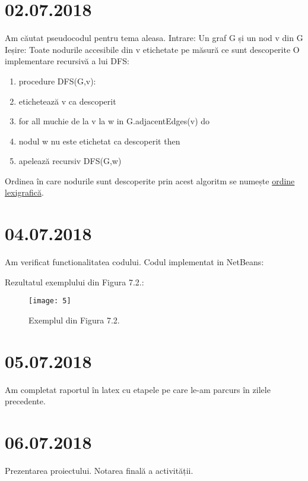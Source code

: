 \documentclass{report}
\begin{document}
\chapter{02.07.2018}
Am căutat pseudocodul pentru tema aleasa.\newline
\hspace*{0.5cm}Intrare: Un graf G și un nod v din G\newline
\hspace*{0.5cm}Ieșire: Toate nodurile accesibile din v etichetate pe măsură ce sunt descoperite\newline
\hspace*{0.5cm}O implementare recursivă a lui DFS:\newline
\begin{enumerate}
\item procedure DFS(G,v):
\item  etichetează v ca descoperit
\item  for all muchie de la v la w in G.adjacentEdges(v) do
\item    \hspace*{1cm} nodul w nu este etichetat ca descoperit then
\item     \hspace{1cm}apelează recursiv DFS(G,w)
\end{enumerate}
\hspace*{0.5cm}Ordinea în care nodurile sunt descoperite prin acest algoritm se numește \underline{ordine lexigrafică}.


\chapter{04.07.2018}
Am verificat functionalitatea codului. \newline
Codul implementat in NetBeans:
\begin{figure}[ht]
  \hspace*{1.5cm}\subfloat[1]{\texttt{[image: 1]}} 
  \hspace*{1.5cm}\subfloat[2]{\texttt{[image: 2]}}\newline
  \hspace*{1.5cm}\subfloat[3]{\texttt{[image: 3]}}
  \hspace*{1.5cm}\subfloat[4]{\texttt{[image: 4]}}
\end{figure}

Rezultatul exemplului din Figura 7.2.:
\begin{figure}[ht]
\centering
\texttt{[image: 5]}
\caption{Exemplul din Figura 7.2.}
\end{figure}

\chapter{05.07.2018}
Am completat raportul în latex cu etapele pe care le-am parcurs în zilele precedente.
\chapter{06.07.2018}
Prezentarea proiectului.
Notarea finală a activității.
\end{document}
